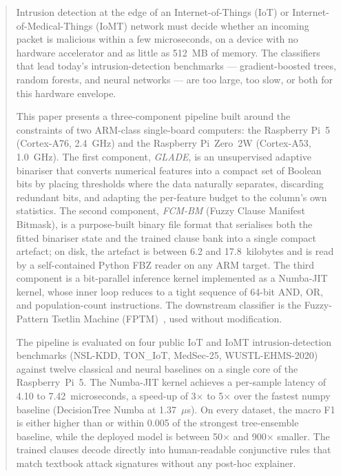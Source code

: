 \documentclass[journal,10pt]{IEEEtran}
\begin{document}
\begin{abstract}
Intrusion detection at the edge of an Internet-of-Things (IoT) or
Internet-of-Medical-Things (IoMT) network must decide whether an
incoming packet is malicious within a few microseconds, on a device
with no hardware accelerator and as little as 512~MB of memory.
The classifiers that lead today's intrusion-detection benchmarks ---
gradient-boosted trees, random forests, and neural networks ---
are too large, too slow, or both for this hardware envelope.

This paper presents a three-component pipeline built around the
constraints of two ARM-class single-board computers: the Raspberry
Pi~5 (Cortex-A76, 2.4~GHz) and the Raspberry Pi~Zero~2W
(Cortex-A53, 1.0~GHz). The first component, \emph{GLADE}, is an
unsupervised adaptive binariser that converts numerical features into
a compact set of Boolean bits by placing thresholds where the data
naturally separates, discarding redundant bits, and adapting the
per-feature budget to the column's own statistics. The second
component, \emph{FCM-BM} (Fuzzy Clause Manifest Bitmask), is a
purpose-built binary file format that serialises both the fitted
binariser state and the trained clause bank into a single compact
artefact; on disk, the artefact is between 6.2 and 17.8~kilobytes
and is read by a self-contained Python FBZ reader on any ARM target. The
third component is a bit-parallel inference kernel implemented as a
Numba-JIT kernel, whose inner loop reduces to a
tight sequence of 64-bit AND, OR, and population-count instructions.
The downstream classifier is the Fuzzy-Pattern Tsetlin Machine
(FPTM)~\cite{hnilov2025fuzzy}, used without modification.

The pipeline is evaluated on four public IoT and IoMT
intrusion-detection benchmarks (NSL-KDD, TON\_IoT, MedSec-25,
WUSTL-EHMS-2020) against twelve classical and neural baselines on a
single core of the Raspberry~Pi~5. The Numba-JIT kernel
achieves a per-sample latency of 4.10 to 7.42~microseconds, a
speed-up of 3$\times$ to 5$\times$ over the fastest numpy baseline
(DecisionTree Numba at 1.37~$\mu$s).
On every dataset, the macro F1 is either higher than or
within 0.005 of the strongest tree-ensemble baseline, while the
deployed model is between 50$\times$ and 900$\times$ smaller. The
trained clauses decode directly into human-readable conjunctive rules
that match textbook attack signatures without any post-hoc explainer.
\end{abstract}
\end{document}
